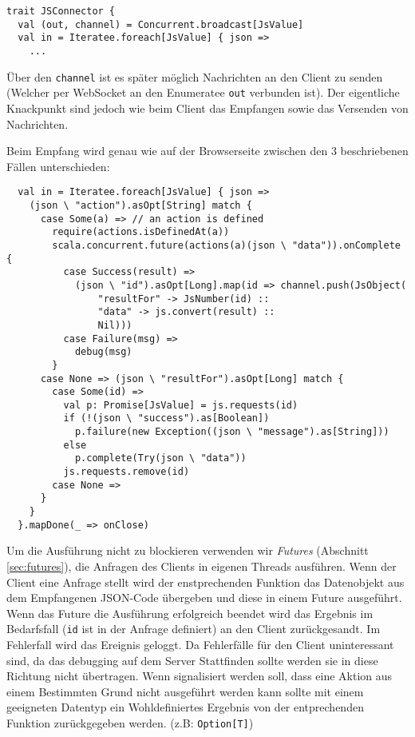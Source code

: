 \begin{lstlisting}
trait JSConnector {
  val (out, channel) = Concurrent.broadcast[JsValue]
  val in = Iteratee.foreach[JsValue] { json =>
    ...
\end{lstlisting}

Über den \texttt{channel} ist es später möglich Nachrichten an den Client zu senden (Welcher per
WebSocket an den Enumeratee \texttt{out} verbunden ist). Der eigentliche Knackpunkt sind jedoch wie
beim Client das Empfangen sowie das Versenden von Nachrichten.

Beim Empfang wird genau wie auf der Browserseite zwischen den 3 beschriebenen Fällen unterschieden:

\begin{lstlisting}
  val in = Iteratee.foreach[JsValue] { json =>    
    (json \ "action").asOpt[String] match {
      case Some(a) => // an action is defined    
        require(actions.isDefinedAt(a))
        scala.concurrent.future(actions(a)(json \ "data")).onComplete {
          case Success(result) =>
            (json \ "id").asOpt[Long].map(id => channel.push(JsObject(
                "resultFor" -> JsNumber(id) ::
                "data" -> js.convert(result) ::
                Nil)))
          case Failure(msg) =>
            debug(msg)
        }
      case None => (json \ "resultFor").asOpt[Long] match {
        case Some(id) =>          
          val p: Promise[JsValue] = js.requests(id)
          if (!(json \ "success").as[Boolean])
            p.failure(new Exception((json \ "message").as[String]))
          else
            p.complete(Try(json \ "data"))
          js.requests.remove(id)
        case None =>
      }
    }
  }.mapDone(_ => onClose)
\end{lstlisting}

Um die Ausführung nicht zu blockieren verwenden wir \textit{Futures} (Abschnitt\,\ref{sec:futures}),
die Anfragen des Clients in eigenen Threads ausführen. Wenn der Client eine Anfrage stellt wird der
enstprechenden Funktion das Datenobjekt aus dem Empfangenen JSON-Code übergeben und diese in einem
Future ausgeführt. Wenn das Future die Ausführung erfolgreich beendet wird das Ergebnis im
Bedarfsfall (\texttt{id} ist in der Anfrage definiert) an den Client zurückgesandt. Im Fehlerfall
wird das Ereignis geloggt. Da Fehlerfälle für den Client uninteressant sind, da das debugging auf
dem Server Stattfinden sollte werden sie in diese Richtung nicht übertragen. Wenn signalisiert
werden soll, dass eine Aktion aus einem Bestimmten Grund nicht ausgeführt werden kann sollte mit
einem geeigneten Datentyp ein Wohldefiniertes Ergebnis von der entprechenden Funktion zurückgegeben
werden. (z.B: \texttt{Option[T]})


